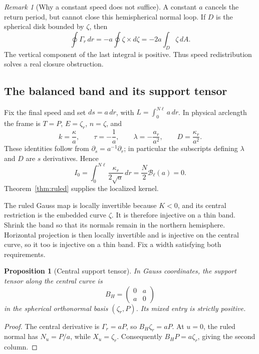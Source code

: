 \documentclass[11pt]{amsart}
\newtheorem{proposition}[theorem]{Proposition}
\theoremstyle{definition}
\theoremstyle{remark}
\newtheorem{remark}[theorem]{Remark}
\numberwithin{equation}{section}
\begin{document}
\begin{remark}[Why a constant speed does not suffice]\label{rem:constant-speed-obstruction}
A constant $a$ cancels the return period, but cannot close this
hemispherical normal loop. If $D$ is the spherical disk bounded by
$\zeta$, then
\[
 \oint\Gamma_r\,dr=-a\oint\zeta\times d\zeta
 =-2a\int_D\zeta\,dA.
\]
The vertical component of the last integral is positive. Thus speed
redistribution solves a real closure obstruction.
\end{remark}

\subsection{The balanced band and its support tensor}
Fix the final speed and set $ds=a\,dr$, with
$L=\int_0^{N\ell}a\,dr$. In physical arclength the frame is
$T=P$, $E=\zeta_r$, $n=\zeta$, and
\begin{equation}\label{eq:frame-speed}
 k=\frac\kappa a,\qquad \tau=-\frac1a,\qquad
 \lambda=-\frac{a_r}{a^2},\qquad D=\frac{\kappa_r}{a^2}.
\end{equation}
These identities follow from $\partial_s=a^{-1}\partial_r$; in particular
the subscripts defining $\lambda$ and $D$ are $s$ derivatives. Hence
\[
 I_0=\int_0^{N\ell}\frac{\kappa_r}{2\sqrt a}\,dr
 =\frac N2\mathscr B_\ell(a)=0.
\]
Theorem~\ref{thm:ruled} supplies the localized kernel.

The ruled Gauss map is locally invertible because $K<0$, and its central
restriction is the embedded curve $\zeta$. It is therefore injective on
a thin band. Shrink the band so that its normals remain in the northern
hemisphere. Horizontal projection is then locally invertible and is
injective on the central curve, so it too is injective on a thin band.
Fix a width satisfying both requirements.

\begin{proposition}[Central support tensor]\label{prop:central-support}
In Gauss coordinates, the support tensor along the central curve is
\begin{equation}\label{eq:central-B}
 B_H=\begin{pmatrix}0&a\\a&0\end{pmatrix}
\end{equation}
in the spherical orthonormal basis $(\zeta_r,P)$. Its mixed entry is
strictly positive.
\end{proposition}
\begin{proof}
The central derivative is $\Gamma_r=aP$, so $B_H\zeta_r=aP$.
At $u=0$, the ruled normal has $N_u=P/a$, while $X_u=\zeta_r$.
Consequently $B_HP=a\zeta_r$, giving the second column.
\end{proof}
\end{document}
